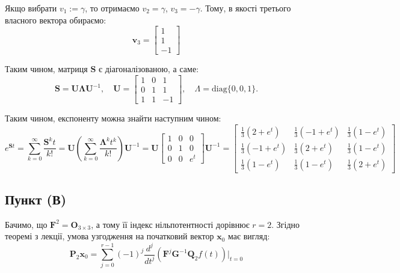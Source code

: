 \documentclass{hw_template}
\begin{document}
Якщо вибрати $v_1 := \gamma$, то отримаємо $v_2=\gamma$, $v_3=-\gamma$. Тому,
в якості третього власного вектора обираємо:
\begin{equation*}
    \mathbf{v}_3 = \begin{bmatrix}
        1 \\ 1 \\ -1
    \end{bmatrix}
\end{equation*}

Таким чином, матриця $\boldsymbol{S}$ є діагоналізованою, а саме:
\begin{equation*}
    \boldsymbol{S} = \boldsymbol{U}\boldsymbol{\Lambda}\boldsymbol{U}^{-1}, \quad 
    \boldsymbol{U} = \begin{bmatrix}
        1 & 0 & 1 \\
        0 & 1 & 1 \\
        1 & 1 & -1
    \end{bmatrix}, \quad \Lambda = \text{diag}\{0,0,1\}.
\end{equation*}

Таким чином, експоненту можна знайти наступним чином:
\begin{equation*}
    e^{\boldsymbol{S}t} = \sum_{k=0}^{\infty} \frac{\boldsymbol{S}^kt}{k!} = \boldsymbol{U}\left(\sum_{k=0}^{\infty} \frac{\boldsymbol{\Lambda}^kt^k}{k!}\right)\boldsymbol{U}^{-1} = \boldsymbol{U}\begin{bmatrix}
        1 & 0 & 0 \\
        0 & 1 & 0 \\
        0 & 0 & e^{t}
    \end{bmatrix}\boldsymbol{U}^{-1} = \begin{bmatrix}
        \frac{1}{3}(2+e^t) & \frac{1}{3}(-1+e^t) & \frac{1}{3}(1-e^t) \\
        \frac{1}{3}(-1+e^t) & \frac{1}{3}(2+e^t) & \frac{1}{3}(1-e^t) \\
        \frac{1}{3}(1-e^t) & \frac{1}{3}(1-e^t) & \frac{1}{3}(2+e^t)
    \end{bmatrix}
\end{equation*}

\subsection{Пункт (В)}

Бачимо, що $\boldsymbol{F}^2=\boldsymbol{O}_{3 \times 3}$, а тому її індекс 
нільпотентності дорівнює $r=2$. Згідно теоремі з лекції, умова узгодження 
на початковий вектор $\mathbf{x}_0$ має вигляд:
\begin{equation*}
    \boldsymbol{P}_2\mathbf{x}_0 = \sum_{j=0}^{r-1}(-1)^j \frac{d^j}{dt^j}(\boldsymbol{F}^j \boldsymbol{G}^{-1}\boldsymbol{Q}_2f(t))\Big|_{t = 0}
\end{equation*}
\end{document}

